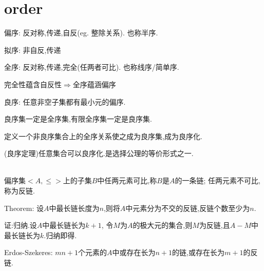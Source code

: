\section{order}
偏序:
反对称,传递,自反(eg. 整除关系).
也称半序.

拟序:
非自反,传递

全序:
反对称,传递,完全(任两者可比).
也称线序/简单序.

完全性蕴含自反性$ \Rightarrow $全序蕴涵偏序

良序:
任意非空子集都有最小元的偏序.

良序集一定是全序集,有限全序集一定是良序集.

定义一个非良序集合上的全序关系使之成为良序集,成为良序化.

(良序定理)任意集合可以良序化.是选择公理的等价形式之一.

\\


偏序集$ <A,\le>$上的子集$ B$中任两元素可比,称$ B$是$ A$的一条链;
任两元素不可比,称为反链.

Theorem:
设$ A$中最长链长度为$ n$,则将$ A$中元素分为不交的反链,反链个数至少为$ n$.

证:归纳.设$ A$中最长链长为$ k+1$,
令$ M$为$ A$的极大元的集合,则$ M$为反链,且$ A-M$中最长链长为$ k$.归纳即得.

Erdos-Szekeres:
$ mn+1$个元素的$ A$中或存在长为$ n+1$的链,或存在长为$ m+1$的反链.
